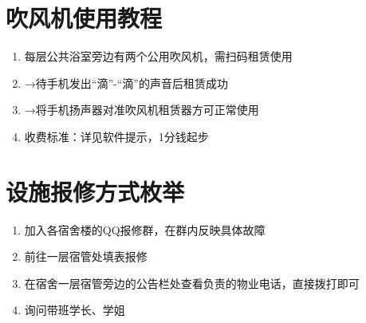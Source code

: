 \section[吹风机使用教程]{吹风机使用教程}
\label{hair_drier}
\begin{enumerate}
    \item 每层公共浴室旁边有两个公用吹风机，需扫码\footnotemark 租赁使用
    \item →待手机发出“滴”-“滴”的声音后租赁成功
    \item →将手机扬声器对准吹风机租赁器方可正常使用
    \item 收费标准：详见软件提示，1分钱起步
\end{enumerate}

\section[设施报修方式枚举]{设施报修方式枚举}
\label{repair_report}
\begin{enumerate}
    \item 加入各宿舍楼的QQ报修群，在群内反映具体故障
    \item 前往一层宿管处填表报修
    \item 在宿舍一层宿管旁边的公告栏处查看负责的物业电话，直接拨打即可
    \item 询问带班学长、学姐
\end{enumerate}

